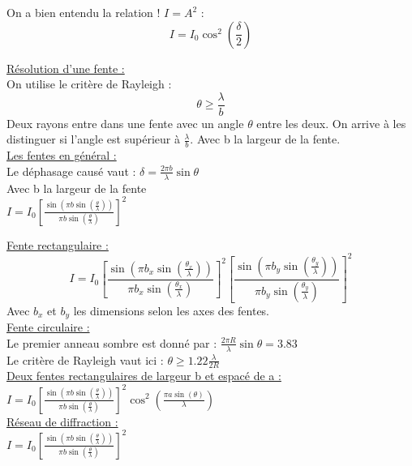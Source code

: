 \documentclass[../main.tex]{subfiles}
\begin{document}
On a bien entendu la relation ! $I = A^2$ :\\
\begin{equation}
    I = I_0 \cos^2(\frac{\delta}{2})
\end{equation}

\quad \underline{Résolution d'une fente :}\\
On utilise le critère de Rayleigh :\\
\begin{equation}
    \theta \geq \frac{\lambda}{b}
\end{equation}
Deux rayons entre dans une fente avec un angle $\theta$ entre les deux. On arrive à les distinguer si l'angle est supérieur à $\frac{\lambda}{b}$. Avec b la largeur de la fente.\\

\quad \underline{Les fentes en général :}\\
Le déphasage causé vaut : $\delta = \frac{2\pi b}{\lambda} \sin{\theta}$\\
Avec b la largeur de la fente\\
$I = I_0 [\frac{\sin{(\pi b \sin{(\frac{\theta}{\lambda})})}}{\pi b \sin{(\frac{\theta}{\lambda})}}]^2$

\quad \underline{Fente rectangulaire :}\\
\begin{equation}
    I = I_0 [\frac{\sin{(\pi b_x \sin{(\frac{\theta_x}{\lambda})})}}{\pi b_x \sin{(\frac{\theta_x}{\lambda})}}]^2 [\frac{\sin{(\pi b_y \sin{(\frac{\theta_y}{\lambda})})}}{\pi b_y \sin{(\frac{\theta_y}{\lambda})}}]^2
\end{equation}
Avec $b_x$ et $b_y$ les dimensions selon les axes des fentes.\\

\quad \underline{Fente circulaire :}\\
Le premier anneau sombre est donné par : $\frac{2\pi R}{\lambda} \sin{\theta} = 3.83$\\
Le critère de Rayleigh vaut ici : $\theta \geq 1.22 \frac{\lambda}{2R}$\\

\quad \underline{Deux fentes rectangulaires de largeur b et espacé de a :}\\
$I = I_0 [\frac{\sin{(\pi b \sin{(\frac{\theta}{\lambda})})}}{\pi b \sin{(\frac{\theta}{\lambda})}}]^2 \cos^2(\frac{\pi a \sin{(\theta)}}{\lambda})$\\

\quad \underline{Réseau de diffraction :}\\
$I = I_0 [\frac{\sin{(\pi b \sin{(\frac{\theta}{\lambda})})}}{\pi b \sin{(\frac{\theta}{\lambda})}}]^2$\\
\end{document}

